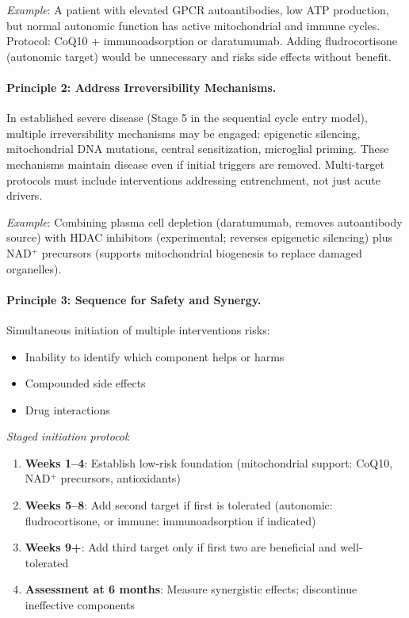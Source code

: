 \textit{Example}: A patient with elevated GPCR autoantibodies, low ATP production, but normal autonomic function has active mitochondrial and immune cycles. Protocol: CoQ10 + immunoadsorption or daratumumab. Adding fludrocortisone (autonomic target) would be unnecessary and risks side effects without benefit.

\paragraph{Principle 2: Address Irreversibility Mechanisms.}

In established severe disease (Stage 5 in the sequential cycle entry model), multiple irreversibility mechanisms may be engaged: epigenetic silencing, mitochondrial DNA mutations, central sensitization, microglial priming. These mechanisms maintain disease even if initial triggers are removed. Multi-target protocols must include interventions addressing entrenchment, not just acute drivers.

\textit{Example}: Combining plasma cell depletion (daratumumab, removes autoantibody source) with HDAC inhibitors (experimental; reverses epigenetic silencing) plus NAD$^+$ precursors (supports mitochondrial biogenesis to replace damaged organelles).

\paragraph{Principle 3: Sequence for Safety and Synergy.}

Simultaneous initiation of multiple interventions risks:
\begin{itemize}
    \item Inability to identify which component helps or harms
    \item Compounded side effects
    \item Drug interactions
\end{itemize}

\textit{Staged initiation protocol}:
\begin{enumerate}
    \item \textbf{Weeks 1--4}: Establish low-risk foundation (mitochondrial support: CoQ10, NAD$^+$ precursors, antioxidants)
    \item \textbf{Weeks 5--8}: Add second target if first is tolerated (autonomic: fludrocortisone, or immune: immunoadsorption if indicated)
    \item \textbf{Weeks 9+}: Add third target only if first two are beneficial and well-tolerated
    \item \textbf{Assessment at 6 months}: Measure synergistic effects; discontinue ineffective components
\end{enumerate}

